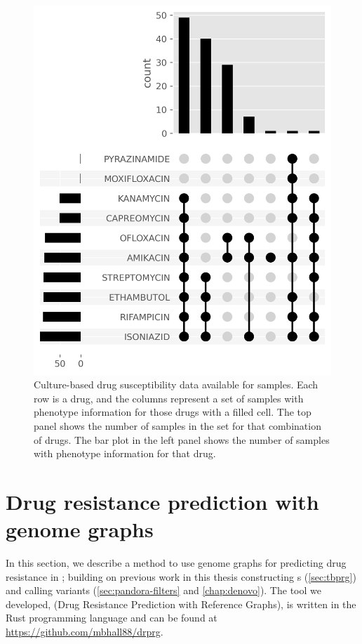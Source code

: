 \begin{figure}
\begin{center}
\includegraphics[width=0.90\columnwidth]{Chapter3/Figs/available_dst.png}
\caption{{Culture-based drug susceptibility data available for samples. Each row is a drug, and the columns represent a set of samples with phenotype information for those drugs with a filled cell. The top panel shows the number of samples in the set for that combination of drugs. The bar plot in the left panel shows the number of samples with phenotype information for that drug.
{\label{fig:available-dst}}
}}
\end{center}
\end{figure}
\section{Drug resistance prediction with genome graphs}
\label{sec:drprg-methods}

In this section, we describe a method to use genome graphs for predicting drug resistance in \mtb{}; building on previous work in this thesis constructing \mtb{} \prg{}s (\autoref{sec:tbprg}) and calling variants (\autoref{sec:pandora-filters} and \autoref{chap:denovo}). The tool we developed, \drprg{} (Drug Resistance Prediction with Reference Graphs), is written in the Rust programming language and can be found at \url{https://github.com/mbhall88/drprg}.

